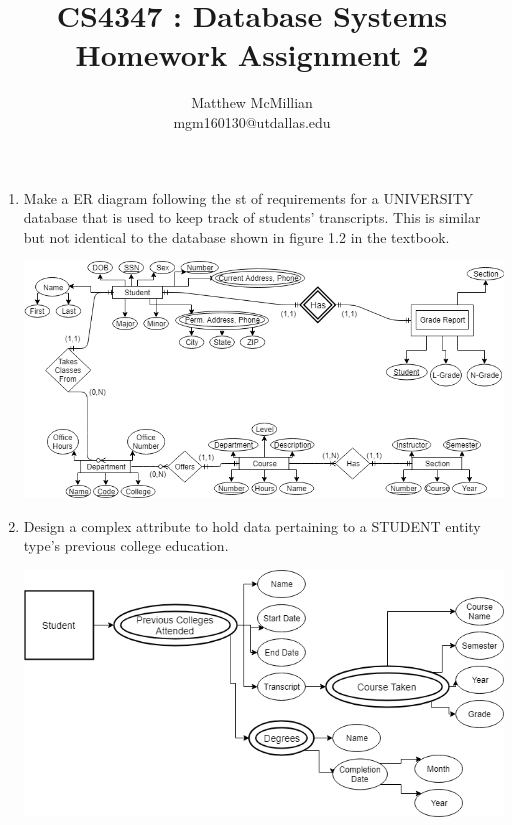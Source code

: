 \documentclass[12pt]{article}
\begin{document}
\title{CS4347 : Database Systems\\Homework Assignment 2}
\author{Matthew McMillian\\mgm160130@utdallas.edu}
\maketitle



\begin{enumerate}
	
	\item Make a ER diagram following the st of requirements for a UNIVERSITY database that is used to keep track of students' transcripts. This is similar but not identical to the database shown in figure 1.2 in the textbook. \\
		\begin{center}
			\includegraphics[scale=0.55]{er}
		\end{center} 
		\pagebreak
	\item Design a complex attribute to hold data pertaining to a STUDENT entity type's previous college education. \\
	\begin{center}
			\includegraphics[scale=0.55]{attr}
		\end{center} 
	
\end{enumerate}
\end{document}
